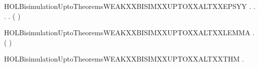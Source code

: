 \begin{SaveVerbatim}{HOLBisimulationUptoTheoremsWEAKXXBISIMXXUPTOXXALTXXEPSYY}
\HOLTokenTurnstile{} \HOLSymConst{\HOLTokenForall{}}.
         \HOLSymConst{\HOLTokenImp{}}
       \HOLSymConst{\HOLTokenForall{}} .
              \HOLSymConst{\HOLTokenImp{}}
           \HOLSymConst{\HOLTokenForall{}}.
                  \HOLSymConst{\HOLTokenImp{}}
               \HOLSymConst{\HOLTokenExists{}}.
                      \HOLSymConst{\HOLTokenConj{}}
                   (    )  
\end{SaveVerbatim}
\newcommand{\HOLBisimulationUptoTheoremsWEAKXXBISIMXXUPTOXXALTXXEPSYY}{\UseVerbatim{HOLBisimulationUptoTheoremsWEAKXXBISIMXXUPTOXXALTXXEPSYY}}
\begin{SaveVerbatim}{HOLBisimulationUptoTheoremsWEAKXXBISIMXXUPTOXXALTXXLEMMA}
\HOLTokenTurnstile{} \HOLSymConst{\HOLTokenForall{}}.
         \HOLSymConst{\HOLTokenImp{}}
        (    )
\end{SaveVerbatim}
\newcommand{\HOLBisimulationUptoTheoremsWEAKXXBISIMXXUPTOXXALTXXLEMMA}{\UseVerbatim{HOLBisimulationUptoTheoremsWEAKXXBISIMXXUPTOXXALTXXLEMMA}}
\begin{SaveVerbatim}{HOLBisimulationUptoTheoremsWEAKXXBISIMXXUPTOXXALTXXTHM}
\HOLTokenTurnstile{} \HOLSymConst{\HOLTokenForall{}}.   \HOLSymConst{\HOLTokenImp{}}   
\end{SaveVerbatim}
\newcommand{\HOLBisimulationUptoTheoremsWEAKXXBISIMXXUPTOXXALTXXTHM}{\UseVerbatim{HOLBisimulationUptoTheoremsWEAKXXBISIMXXUPTOXXALTXXTHM}}
